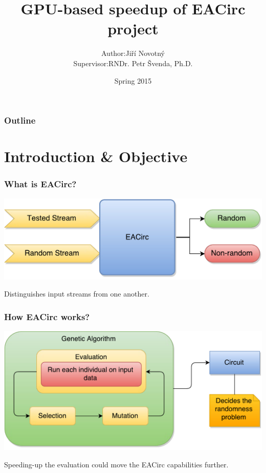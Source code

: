 \documentclass[czech]{beamer}
\begin{document}
	
	\title{GPU-based speedup of EACirc project}
	\author[Jiří Novotný]{\begin{tabular}{r l}Author: &Jiří Novotný\\Supervisor: &RNDr. Petr Švenda, Ph.D.\end{tabular}}
	\date{Spring 2015}

	\frame{\titlepage}
	
	\begin{frame}
		\frametitle{Outline}
		\tableofcontents
	\end{frame}
	
	\section{Introduction \& Objective}
	\begin{frame}
		\frametitle{What is EACirc?}
		\centering
		\includegraphics[width=.8\textheight]{eacirc}
		
		\bigskip
		Distinguishes input streams from one another.
	\end{frame}
	
	\begin{frame}
		\frametitle{How EACirc works?}
		\centering
		\includegraphics[width=.7\textwidth]{ga}
		
		\medskip
		\small{Speeding-up the evaluation could move the EACirc capabilities further.}
	\end{frame}
	
\end{document}
